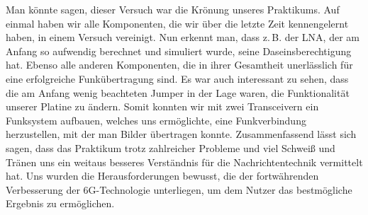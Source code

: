 Man könnte sagen, dieser Versuch war die Krönung unseres Praktikums. 
Auf einmal haben wir alle Komponenten, die wir über die letzte Zeit kennengelernt haben, in einem Versuch vereinigt.
Nun erkennt man, dass z.\,B. der LNA, der am Anfang so aufwendig berechnet und simuliert wurde, seine Daseinsberechtigung hat.
Ebenso alle anderen Komponenten, die in ihrer Gesamtheit unerlässlich für eine erfolgreiche Funkübertragung sind.
Es war auch interessant zu sehen, dass die am Anfang wenig beachteten Jumper in der Lage waren, die Funktionalität
unserer Platine zu ändern. Somit konnten wir mit zwei Transceivern ein Funksystem aufbauen, welches uns ermöglichte, eine Funkverbindung herzustellen,
mit der man Bilder übertragen konnte.
Zusammenfassend lässt sich sagen, dass das Praktikum trotz zahlreicher Probleme und viel Schweiß und Tränen uns ein weitaus besseres Verständnis für die Nachrichtentechnik vermittelt hat.
Uns wurden die Herausforderungen bewusst, die der fortwährenden Verbesserung der 6G-Technologie unterliegen, um dem Nutzer das bestmögliche Ergebnis zu ermöglichen.